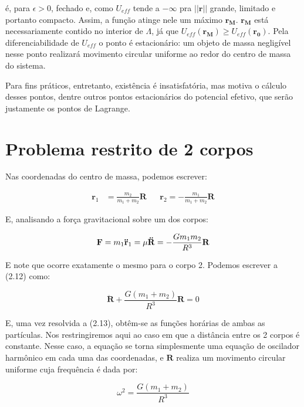 é, para $\epsilon > 0$, fechado e, como $U_{eff}$ tende a $-\infty$ pra $||\mathbf{r}||$ grande, limitado e portanto compacto. Assim, a função atinge nele um máximo $\mathbf{r_M}$. $\mathbf{r_M}$ está necessariamente contido no interior de $\Lambda$, já que $U_{eff}(\mathbf{r_M}) \geq U_{eff}(\mathbf{r_0})$. Pela diferenciabilidade de $U_{eff}$ o ponto é estacionário: um objeto de massa negligível nesse ponto realizará movimento circular uniforme ao redor do centro de massa do sistema.

Para fins práticos, entretanto, existência é insatisfatória, mas motiva o cálculo desses pontos, dentre outros pontos estacionários do potencial efetivo, que serão justamente os pontos de Lagrange.

\section{Problema restrito de 2 corpos}

Nas coordenadas do centro de massa, podemos escrever:

\begin{align}
    \mathbf{r}_1 &=  \frac{m_2}{m_1 + m_2}\mathbf{R} && \mathbf{r}_2 = - \frac{m_1}{m_1 + m_2}\mathbf{R}
\end{align}

E, analisando a força gravitacional sobre um dos corpos:

\begin{equation}
\mathbf{F} = m_1\mathbf{\ddot{r}}_1 = \mu\mathbf{\ddot{R}} = -\frac{Gm_1m_2}{R^3}\mathbf{R} \\
\end{equation}

E note que ocorre exatamente o mesmo para o corpo 2. Podemos escrever a (2.12) como:

\begin{equation}
\mathbf{\ddot{R}} + \frac{G(m_1+m_2)}{R^3}\mathbf{{R}} = 0
\end{equation}

E, uma vez resolvida a (2.13), obtêm-se as funções horárias de ambas as partículas. Nos restringiremos aqui ao caso em que a distância entre os 2 corpos é constante. Nesse caso, a equação se torna simplesmente uma equação de oscilador harmônico em cada uma das coordenadas, e $\mathbf{R}$
realiza um movimento circular uniforme cuja frequência é dada por:

\begin{equation}
\omega^2 = \frac{G(m_1+m_2)}{R^3}
\end{equation}

